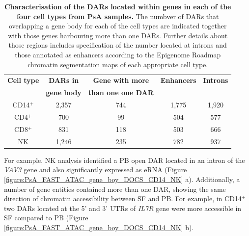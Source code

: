 \begin{table}[htbp]
\centering
\begin{tabular}{@{} c c c c c}
\toprule
\textbf{Cell type} & \textbf{DARs in} &  \textbf{Gene with more}     &\textbf{Enhancers} & \textbf{Introns} \\
                   & \textbf{gene body} &  \textbf{than one one DAR} &                   &                   \\
\midrule
\midrule
CD14$^+$ & 2,357 & 744 & 1,775 & 1,920 \\
CD4$^+$ & 700 & 99 & 504 & 577 \\
CD8$^+$ & 831 & 118 & 503 & 666 \\
NK   & 1,246 & 235 & 782 & 937 \\   
\bottomrule
\end{tabular}
\medskip %
\caption[Characterisation of the DARs located within genes in each of the four cell types from PsA samples.]{\textbf{Characterisation of the DARs located within genes in each of the four cell types from PsA samples.} The numbver of DARs that overlapping a gene body for each of the cell types are indicated together with those genes harbouring more than one DARs. Further details about those regions includes specification of the number located at introns and those annotated as enhancers according to the Epigenome Roadmap chromatin segmentation maps of each appropriate cell type.}
\label{tab:PSA_DOCs_gene_body}
\end{table}

For example, NK analysis identified a PB open DAR located in an intron of the \textit{VAV3} gene and also significantly expressed as eRNA (Figure \ref{figure:PsA_FAST_ATAC_gene_boy_DOCS_CD14_NK} a). Additionally, a number of gene entities contained more than one DAR, showing the same direction of chromatin accessibility between SF and PB. For example, in CD14$^+$ two DARs located at the 5' and 3' UTRs of \textit{IL7R} gene were more accessible in SF compared to PB (Figure \ref{figure:PsA_FAST_ATAC_gene_boy_DOCS_CD14_NK} b). 

